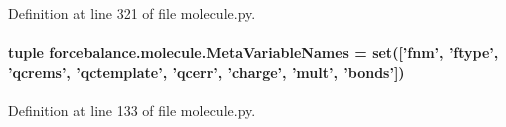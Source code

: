 Definition at line 321 of file molecule.\-py.

\hypertarget{namespaceforcebalance_1_1molecule_a38e1c99e9567fe42b792af43db9b7488}{
\paragraph[{Meta\-Variable\-Names}]{\setlength{\rightskip}{0pt plus 5cm}tuple forcebalance.\-molecule.\-Meta\-Variable\-Names = set(\mbox{[}'fnm', 'ftype', 'qcrems', 'qctemplate', 'qcerr', 'charge', 'mult', 'bonds'\mbox{]})}}\label{namespaceforcebalance_1_1molecule_a38e1c99e9567fe42b792af43db9b7488}


Definition at line 133 of file molecule.\-py.

